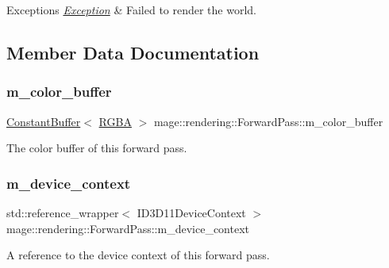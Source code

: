 \begin{DoxyExceptions}{Exceptions}
{\em \hyperlink{classmage_1_1_exception}{Exception}} & Failed to render the world. \\
\hline
\end{DoxyExceptions}


\subsection{Member Data Documentation}
\hypertarget{classmage_1_1rendering_1_1_forward_pass_ace4259d7a292982a3f3111b24fcf7c51}{}\label{classmage_1_1rendering_1_1_forward_pass_ace4259d7a292982a3f3111b24fcf7c51} 
\subsubsection{\texorpdfstring{m\+\_\+color\+\_\+buffer}{m\_color\_buffer}}
{\footnotesize\ttfamily \hyperlink{classmage_1_1rendering_1_1_constant_buffer}{Constant\+Buffer}$<$ \hyperlink{structmage_1_1_r_g_b_a}{R\+G\+BA} $>$ mage\+::rendering\+::\+Forward\+Pass\+::m\+\_\+color\+\_\+buffer\hspace{0.3cm}{\ttfamily [private]}}

The color buffer of this forward pass. \hypertarget{classmage_1_1rendering_1_1_forward_pass_a4bc03d77fd5a385a9c5878db8028dcc4}{}\label{classmage_1_1rendering_1_1_forward_pass_a4bc03d77fd5a385a9c5878db8028dcc4} 
\subsubsection{\texorpdfstring{m\+\_\+device\+\_\+context}{m\_device\_context}}
{\footnotesize\ttfamily std\+::reference\+\_\+wrapper$<$ I\+D3\+D11\+Device\+Context $>$ mage\+::rendering\+::\+Forward\+Pass\+::m\+\_\+device\+\_\+context\hspace{0.3cm}{\ttfamily [private]}}

A reference to the device context of this forward pass. \hypertarget{classmage_1_1rendering_1_1_forward_pass_a2b0fe58480704725219acff176695819}{}\label{classmage_1_1rendering_1_1_forward_pass_a2b0fe58480704725219acff176695819} 
